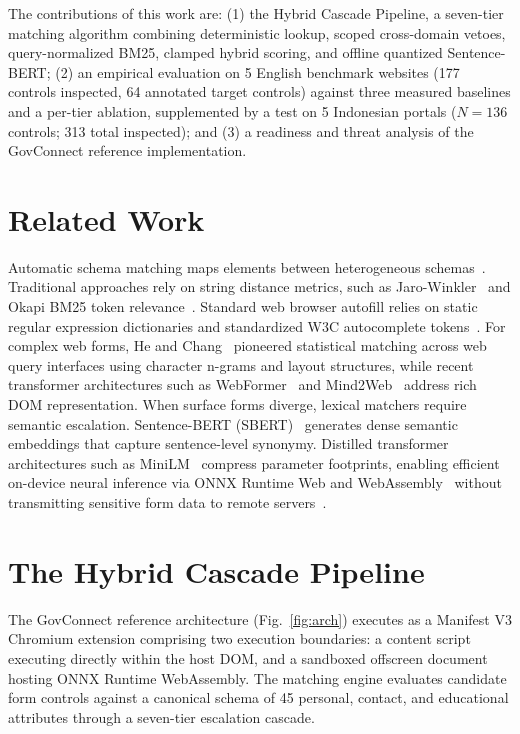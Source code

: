 \documentclass[11pt,runningheads,a4paper]{llncs}
\begin{document}
The contributions of this work are: (1) the Hybrid Cascade Pipeline, a seven-tier matching algorithm combining deterministic lookup, scoped cross-domain vetoes, query-normalized BM25, clamped hybrid scoring, and offline quantized Sentence-BERT; (2) an empirical evaluation on 5 English benchmark websites (177 controls inspected, 64 annotated target controls) against three measured baselines and a per-tier ablation, supplemented by a test on 5 Indonesian portals ($N=136$ controls; 313 total inspected); and (3) a readiness and threat analysis of the GovConnect reference implementation.

\section{Related Work}
Automatic schema matching maps elements between heterogeneous schemas~\cite{rahm}. Traditional approaches rely on string distance metrics, such as Jaro-Winkler~\cite{jaro,winkler} and Okapi BM25 token relevance~\cite{bm25}. Standard web browser autofill relies on static regular expression dictionaries and standardized W3C autocomplete tokens~\cite{chromium}. For complex web forms, He and Chang~\cite{he} pioneered statistical matching across web query interfaces using character n-grams and layout structures, while recent transformer architectures such as WebFormer~\cite{webformer} and Mind2Web~\cite{mind2web} address rich DOM representation. When surface forms diverge, lexical matchers require semantic escalation. Sentence-BERT (SBERT)~\cite{sbert} generates dense semantic embeddings that capture sentence-level synonymy. Distilled transformer architectures such as MiniLM~\cite{minilm} compress parameter footprints, enabling efficient on-device neural inference via ONNX Runtime Web and WebAssembly~\cite{onnxweb,transformersjs} without transmitting sensitive form data to remote servers~\cite{kairouz2021}.

\section{The Hybrid Cascade Pipeline}
The GovConnect reference architecture (Fig.~\ref{fig:arch}) executes as a Manifest V3 Chromium extension comprising two execution boundaries: a content script executing directly within the host DOM, and a sandboxed offscreen document hosting ONNX Runtime WebAssembly. The matching engine evaluates candidate form controls against a canonical schema of 45 personal, contact, and educational attributes through a seven-tier escalation cascade.
\end{document}
